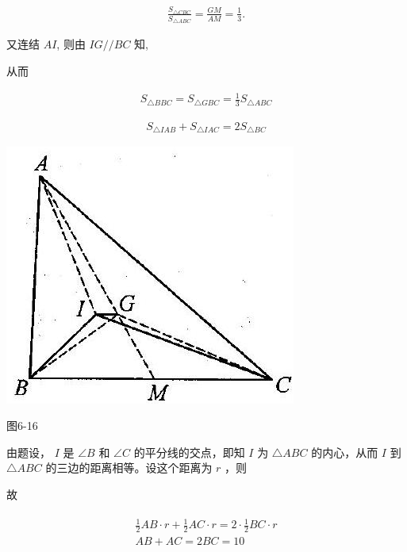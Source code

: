 \documentclass[10pt]{article}
\begin{document}
\begin{align*}
\frac{S_{\triangle C B C}}{S_{\triangle A B C}}=\frac{G M}{A M}=\frac{1}{3} .
\end{align*}

又连结 $A I$, 则由 $I G / / B C$ 知,

从而

\begin{align*}
S_{\triangle B B C}=S_{\triangle G B C}=\frac{1}{3} S_{\triangle A B C}
\end{align*}

\begin{align*}
S_{\triangle I A B}+S_{\triangle I A C}=2 S_{\triangle B C}
\end{align*}

\begin{center}
\includegraphics[max width=\textwidth]{2024_10_30_2c8f45efd4a519b08e1ag-068}
\end{center}

图6-16

由题设， $I$ 是 $\angle B$ 和 $\angle C$ 的平分线的交点，即知 $I$ 为 $\triangle A B C$ 的内心，从而 $I$ 到 $\triangle A B C$ 的三边的距离相等。设这个距离为 $r$ ，则

故

\begin{align*}
\begin{gathered}
\frac{1}{2} A B \cdot r+\frac{1}{2} A C \cdot r=2 \cdot \frac{1}{2} B C \cdot r \\
A B+A C=2 B C=10
\end{gathered}
\end{align*}
\end{document}

